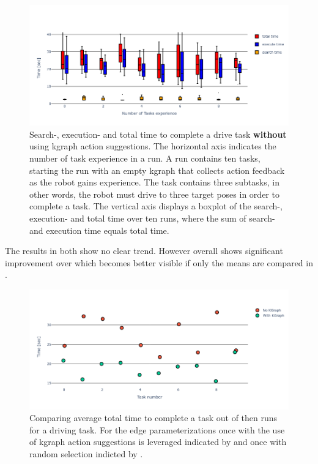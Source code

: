 \begin{figure}[H]
    \centering
    \includegraphics[width=\textwidth]{figures/results/random_drive_time_no_kgraph}
    \caption{Search-, execution- and total time to complete a drive task \textbf{without} using \ac{kgraph} action suggestions. The horizontal axis indicates the number of task experience in a run. A run contains ten tasks, starting the run with an empty \ac{kgraph} that collects action feedback as the robot gains experience. The task contains three subtasks, in other words, the robot must drive to three target poses in order to complete a task. The vertical axis displays a boxplot of the search-, execution- and total time over ten runs, where the sum of search- and execution time equals total time.}%
   \label{fig:random_drive_time_no_kgraph}
\end{figure}


The results in both  show no clear trend. However overall  shows significant improvement over  which becomes better visible if only the means are compared in .\bs

\begin{figure}[H]
    \centering
    \includegraphics[width=\textwidth]{figures/results/random_drive_time_vs}
    \caption{Comparing average total time to complete a task out of then runs for a driving task. For the edge parameterizations once with the use of \ac{kgraph} action suggestions is leveraged indicated by  and once with random selection indicted by .}%
    \label{fig:random_drive_time_vs}
\end{figure}

